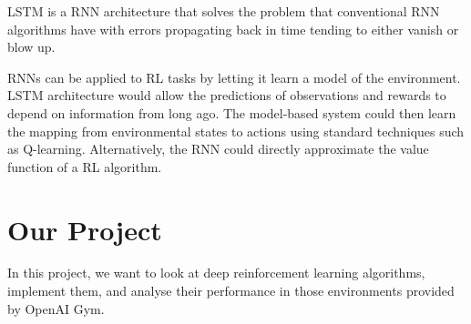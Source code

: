 \documentclass{article}
\begin{document}
LSTM is a RNN architecture that solves the problem that conventional RNN algorithms have with errors propagating back in time tending to either vanish or blow up.

RNNs can be applied to RL tasks by letting it learn a model of the environment. LSTM architecture would allow the predictions of observations and rewards to depend on information from long ago. The model-based system could then learn the mapping from environmental states to actions using standard techniques such as Q-learning. Alternatively, the RNN could directly approximate the value function of a RL algorithm.

\section{Our Project}

In this project, we want to look at deep reinforcement learning algorithms, implement them, and analyse their performance in those environments provided by OpenAI Gym.

\printbibliography
\end{document}
